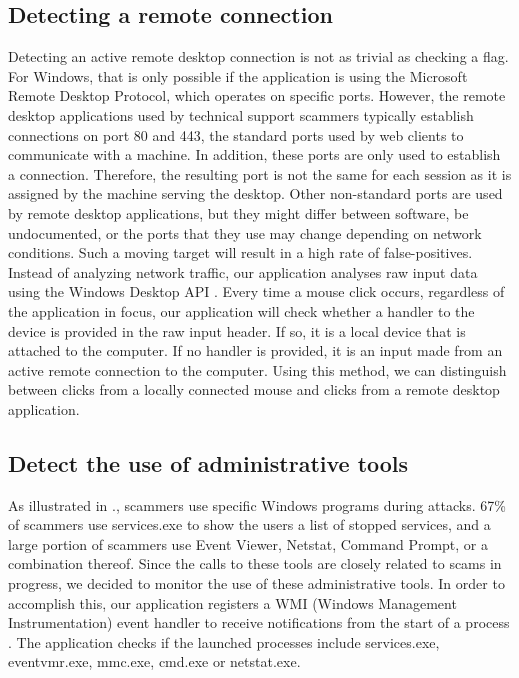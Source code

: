 \documentclass[final]{IEEEtran}
\begin{document}
\subsection{Detecting a remote connection}
Detecting an active remote desktop connection is not as trivial as checking a flag. For Windows, that is only possible if the application is using the Microsoft Remote Desktop Protocol, which operates on specific ports. However, the remote desktop applications used by technical support scammers typically establish connections on port 80 and 443, the standard ports used by web clients to communicate with a machine. In addition, these ports are only used to establish a connection. Therefore, the resulting port is not the same for each session as it is assigned by the machine serving the desktop. Other non-standard ports are used by remote desktop applications, but they might differ between software,  be undocumented, or the ports that they use may change depending on network conditions. Such a moving target will result in a high rate of false-positives. Instead of analyzing network traffic, our application analyses raw input data using the Windows Desktop API \cite {b4}. Every time a mouse click occurs, regardless of the application in focus, our application will check whether a handler to the device is provided in the raw input header. If so, it is a local device that is attached to the computer. If no handler is provided, it is an input made from an active remote connection to the computer. Using this method, we can distinguish between clicks from a locally connected mouse and clicks from a remote desktop application.

\subsection{Detect the use of administrative tools}
As illustrated in \cite[Fig 2]{b2}., scammers use specific Windows programs during attacks. 67\% of scammers use services.exe to show the users a list of stopped services, and a large portion of scammers use Event Viewer, Netstat, Command Prompt, or a combination thereof. Since the calls to these tools are closely related to scams in progress, we decided to monitor the use of these administrative tools. In order to accomplish this, our application registers a WMI (Windows Management Instrumentation) event handler to receive notifications from the start of a process \cite{b9}. The application checks if the launched processes include services.exe, eventvmr.exe, mmc.exe, cmd.exe or netstat.exe.
\end{document}
